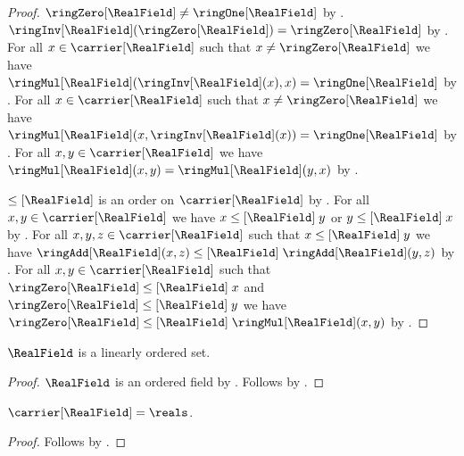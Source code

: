 \begin{proof}
    $\ringZero[\RealField]\neq\ringOne[\RealField]$
        by
        .
    $\ringInv[\RealField](\ringZero[\RealField])
        =\ringZero[\RealField]$
        by .
    For all $x\in\carrier[\RealField]$ such that
        $x\neq\ringZero[\RealField]$ we have
        $\ringMul[\RealField](\ringInv[\RealField](x),x)
            =\ringOne[\RealField]$
        by
        .
    For all $x\in\carrier[\RealField]$ such that
        $x\neq\ringZero[\RealField]$ we have
        $\ringMul[\RealField](x,\ringInv[\RealField](x))
            =\ringOne[\RealField]$
        by
        .
    For all $x,y\in\carrier[\RealField]$ we have
        $\ringMul[\RealField](x,y)=\ringMul[\RealField](y,x)$
        by .

    $\leq[\RealField]$ is an order on $\carrier[\RealField]$
        by .
    For all $x,y\in\carrier[\RealField]$ we have
        $x\mathrel{\leq[\RealField]}y$ or
        $y\mathrel{\leq[\RealField]}x$
        by .
    For all $x,y,z\in\carrier[\RealField]$ such that
        $x\mathrel{\leq[\RealField]}y$ we have
        $\ringAdd[\RealField](x,z)
            \mathrel{\leq[\RealField]}
        \ringAdd[\RealField](y,z)$
        by .
    For all $x,y\in\carrier[\RealField]$ such that
        $\ringZero[\RealField]\mathrel{\leq[\RealField]}x$ and
        $\ringZero[\RealField]\mathrel{\leq[\RealField]}y$ we have
        $\ringZero[\RealField]\mathrel{\leq[\RealField]}
            \ringMul[\RealField](x,y)$
        by .

\end{proof}

\begin{theorem}\label{surreal_real_field_is_linearly_ordered_set}
    $\RealField$ is a linearly ordered set.
\end{theorem}
\begin{proof}
    $\RealField$ is an ordered field by
        .
    Follows by .
\end{proof}

\begin{proposition}\label{surreal_real_field_carrier}
    $\carrier[\RealField]=\reals$.
\end{proposition}
\begin{proof}
    Follows by .
\end{proof}

